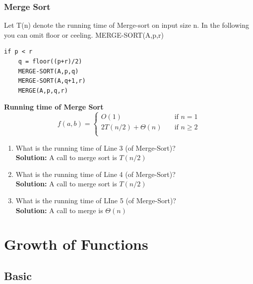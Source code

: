 \documentclass[11pt,fleqn]{book}
\begin{document}
\subsection{Merge Sort} 
\begin{example}
Let T(n) denote the running time of Merge-sort on input size n. In the following you can omit floor or ceeling. 
MERGE-SORT(A,p,r)
\begin{lstlisting}
if p < r 
    q = floor((p+r)/2)
    MERGE-SORT(A,p,q)
    MERGE-SORT(A,q+1,r)
    MERGE(A,p,q,r)
\end{lstlisting}
\end{example}
\begin{remark}
\textbf{Running time of Merge Sort} 
\[
f(a,b) = 
     \begin{cases}
       O(1) &\quad\text{if } n = 1\\
       2T(n/2) + \Theta(n) &\quad\text{if }  n \geq 2 \\
     \end{cases}
\]
\end{remark}
\begin{enumerate}
    \item What is the running time of Line 3 (of Merge-Sort)? \\
    \textbf{Solution:} A call to merge sort is $T(n/2)$
    \item What is the running time of Line 4 (of Merge-Sort)?\\
     \textbf{Solution:} A call to merge sort is $T(n/2)$
    \item What is the running time of LIne 5 (of Merge-Sort)?\\
     \textbf{Solution:} A call to merge is $\Theta(n)$
\end{enumerate}

\chapter{ Growth of Functions}

\section{Basic}
\end{document}
